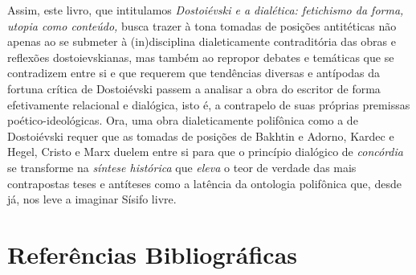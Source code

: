 Assim, este livro, que intitulamos \emph{Dostoiévski e a dialética:
fetichismo da forma, utopia como conteúdo,} busca trazer à tona tomadas
de posições antitéticas não apenas ao se submeter à (in)disciplina
dialeticamente contraditória das obras e reflexões dostoievskianas, mas
também ao repropor debates e temáticas que se contradizem entre si e que
requerem que tendências diversas e antípodas da fortuna crítica de
Dostoiévski passem a analisar a obra do escritor de forma efetivamente
relacional e dialógica, isto é, a contrapelo de suas próprias premissas
poético-ideológicas. Ora, uma obra dialeticamente polifônica como a de
Dostoiévski requer que as tomadas de posições de Bakhtin e Adorno,
Kardec e Hegel, Cristo e Marx duelem entre si para que o princípio
dialógico de \emph{concórdia} se transforme na \emph{síntese histórica}
que \emph{eleva} o teor de verdade das mais contrapostas teses e
antíteses como a latência da ontologia polifônica que, desde já, nos
leve a imaginar Sísifo livre.

\chapter*{Referências Bibliográficas}



